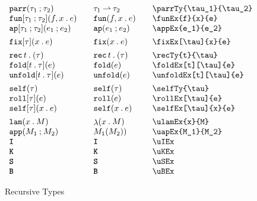 \documentclass[11pt]{article}
\begin{document}
\begin{figure}

  \begin{small}
    \begin{displaymath}
      \begin{array}{l@{\qquad}l@{\qquad}l@{\qquad}l}
        \parrTy{\tau_1}{\tau_2} & \parrTy*{\tau_1}{\tau_2} & \verb|\parrTy{\tau_1}{\tau_2}| \\
        \funEx{f}{x}{e}         & \funEx*{f}{x}{e}         & \verb|\funEx{f}{x}{e}|         \\
        \appEx{e_1}{e_2}        & \appEx*{e_1}{e_2}        & \verb|\appEx{e_1}{e_2}|        \\[1ex]
  
        \fixEx[\tau]{x}{e}      & \fixEx*[\tau]{x}{e}      & \verb|\fixEx[\tau]{x}{e}|      \\[1ex]
  
        \recTy{t}{\tau}         & \recTy*{t}{\tau}         & \verb|\recTy{t}{\tau}|         \\
        \foldEx[t][\tau]{e}     & \foldEx*{e}              & \verb|\foldEx[t][\tau]{e}|     \\
        \unfoldEx[t][\tau]{e}   & \unfoldEx*{e}            & \verb|\unfoldEx[t][\tau]{e}|   \\[1ex]
  
        \selfTy{\tau}           & \selfTy*{\tau}           & \verb|\selfTy{\tau}|           \\
        \rollEx[\tau]{e}        & \rollEx*{e}              & \verb|\rollEx[\tau]{e}|        \\
        \selfEx[\tau]{x}{e}     & \selfEx*{x}{e}           & \verb|\selfEx[\tau]{x}{e}|     \\[1ex]
  
        \ulamEx{x}{M}           & \ulamEx*{x}{M}           & \verb|\ulamEx{x}{M}|           \\
        \uapEx{M_1}{M_2}        & \uapEx*{M_1}{M_2}        & \verb|\uapEx{M_1}{M_2}|        \\
        \uIEx                   & \uIEx*                   & \verb|\uIEx|                   \\
        \uKEx                   & \uKEx*                   & \verb|\uKEx|                   \\
        \uSEx                   & \uSEx*                   & \verb|\uSEx|                   \\
        \uBEx                   & \uBEx*                   & \verb|\uBEx|
      \end{array}
    \end{displaymath}
  \end{small}
  
  \caption{Recursive Types}
  \label{fig:recursive}
\end{figure}
\end{document}
